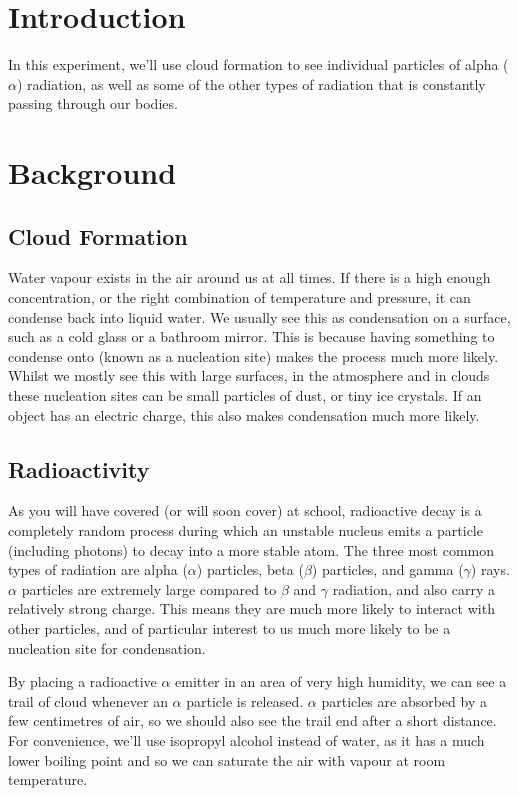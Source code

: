 \documentclass{article}
\begin{document}
\section{Introduction}

In this experiment, we'll use cloud formation to see individual particles of
alpha ($\alpha$) radiation, as well as some of the other types of radiation that
is constantly passing through our bodies.

\section{Background}

\subsection{Cloud Formation}

Water vapour exists in the air around us at all times. If there is a high enough
concentration, or the right combination of temperature and pressure, it can
condense back into liquid water. We usually see this as condensation on a
surface, such as a cold glass or a bathroom mirror. This is because having
something to condense onto (known as a nucleation site) makes the process much
more likely. Whilst we mostly see this with large surfaces, in the atmosphere
and in clouds these nucleation sites can be small particles of dust, or tiny ice
crystals. If an object has an electric charge, this also makes condensation much
more likely.

\subsection{Radioactivity}

As you will have covered (or will soon cover) at school, radioactive decay is a
completely random process during which an unstable nucleus emits a particle
(including photons) to decay into a more stable atom. The three most common
types of radiation are alpha ($\alpha$) particles, beta ($\beta$) particles, and
gamma ($\gamma$) rays. $\alpha$ particles are extremely large compared to
$\beta$ and $\gamma$ radiation, and also carry a relatively strong charge. This
means they are much more likely to interact with other particles, and of
particular interest to us much more likely to be a nucleation site for
condensation.

By placing a radioactive $\alpha$ emitter in an area of very high humidity, we
can see a trail of cloud whenever an $\alpha$ particle is released. $\alpha$
particles are absorbed by a few centimetres of air, so we should also see the
trail end after a short distance. For convenience, we'll use isopropyl alcohol
instead of water, as it has a much lower boiling point and so we can saturate
the air with vapour at room temperature.
\end{document}
